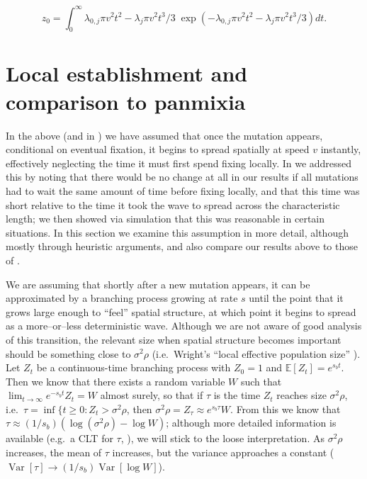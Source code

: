 \documentclass{article}
\newcommand{\var}{\mathop{\mbox{Var}}}
\newcommand{\E}{\mathbb{E}}
\begin{document}
\begin{equation}
    z_0 = \int_0^\infty {\lambda_{0,j} \pi v^2 t^2 - \lambda_j \pi v^2 t^3 / 3} \; \exp \left( - \lambda_{0,j} \pi v^2 t^2 - \lambda_j \pi v^2 t^3 / 3 \right) dt .
\end{equation}


\section{Local establishment and comparison to panmixia}

In the above (and in \citet{ralphcoop2010}) we have assumed that once the mutation appears,
conditional on eventual fixation, it begins to spread spatially at speed $v$ instantly,
effectively neglecting the time it must first spend fixing locally.
In \citet{ralphcoop2010} we addressed this by noting that there would be no change at all in our results 
if all mutations had to wait the same amount of time before fixing locally,
and that this time was short relative to the time it took the wave to spread across the characteristic length;
we then showed via simulation that this was reasonable in certain situations.
In this section we examine this assumption in more detail, although mostly through heuristic arguments,
and also compare our results above to those of \citet{softsweeps}.

We are assuming that shortly after a new mutation appears, 
it can be approximated by a branching process growing at rate $s$
until the point that it grows large enough to ``feel'' spatial structure,
at which point it begins to spread as a more--or--less deterministic wave.
Although we are not aware of good analysis of this transition, 
the relevant size when spatial structure becomes important
should be something close to $\sigma^2 \rho$ 
(i.e.\ Wright's ``local effective population size'' \citep{XXX}).
Let $Z_t$ be a continuous-time branching process with $Z_0=1$ and $\E[Z_t] = e^{s_b t}$.
Then we know that there exists a random variable $W$ such that $\lim_{t\to\infty} e^{-s_b t} Z_t = W$ almost surely,
so that if $\tau$ is the time $Z_t$ reaches size $\sigma^2 \rho$, i.e.\ $\tau = \inf\{ t \ge 0: Z_t > \sigma^2 \rho$,
then $\sigma^2 \rho = Z_\tau \approx e^{s_b \tau} W$.
From this we know that $\tau \approx (1/s_b) (\log (\sigma^2 \rho) - \log W)$;
although more detailed information is available (e.g.\ a CLT for $\tau$, \citet{XXX}),
we will stick to the loose interpretation.
As $\sigma^2 \rho$ increases, the mean of $\tau$ increases, but the variance approaches a constant
($\var[\tau] \to (1/s_b) \var[\log W]$).
\end{document}
